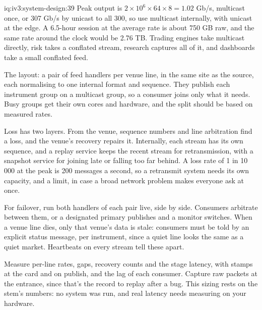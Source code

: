\begin{solution}{iq:iv3:system-design:39}
Peak output is $2 \times 10^6 \times 64 \times 8 = 1.02$ Gb/s, multicast once, or 307 Gb/s by unicast to all 300, so use multicast internally, with unicast at the edge. A 6.5-hour session at the average rate is about 750 GB raw, and the same rate around the clock would be 2.76 TB. Trading engines take multicast directly, risk takes a conflated stream, research captures all of it, and dashboards take a small conflated feed.

The layout: a pair of feed handlers per venue line, in the same site as the source, each normalising to one internal format and sequence. They publish each instrument group on a multicast group, so a consumer joins only what it needs. Busy groups get their own cores and hardware, and the split should be based on measured rates.

Loss has two layers. From the venue, sequence numbers and line arbitration find a loss, and the venue's recovery repairs it. Internally, each stream has its own sequence, and a replay service keeps the recent stream for retransmission, with a snapshot service for joining late or falling too far behind. A loss rate of 1 in 10\,000 at the peak is 200 messages a second, so a retransmit system needs its own capacity, and a limit, in case a broad network problem makes everyone ask at once.

For failover, run both handlers of each pair live, side by side. Consumers arbitrate between them, or a designated primary publishes and a monitor switches. When a venue line dies, only that venue's data is stale: consumers must be told by an explicit status message, per instrument, since a quiet line looks the same as a quiet market. Heartbeats on every stream tell these apart.

Measure per-line rates, gaps, recovery counts and the stage latency, with stamps at the card and on publish, and the lag of each consumer. Capture raw packets at the entrance, since that's the record to replay after a bug. This sizing rests on the stem's numbers: no system was run, and real latency needs measuring on your hardware.

\end{solution}

